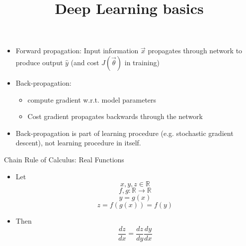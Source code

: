 



\newcommand{\learninggoals}{
\item Understand the concept of regularization
\item Understand L2 regularization in more detail}

\title{Deep Learning basics}
\date{}




\begin{vbframe}{}

\vfill

\begin{itemize}
\item Forward propagation: Input information $\vec x$ propagates through network to produce output $\hat y$ (and cost $J(\vec\theta)$ in training)
\item Back-propagation: 
\begin{itemize}
 \item compute gradient w.r.t. model parameters
 \item Cost gradient propagates backwards through the network
\end{itemize}
\item Back-propagation is part of learning procedure (e.g. stochastic gradient descent), not learning procedure in itself.

\end{itemize}
\begin{center}
\end{center}

\vfill

\end{vbframe}



\begin{vbframe}{Chain Rule of Calculus: Real Functions}

\vfill

\begin{itemize}
\item Let
$$x, y, z \in \mathbb{R}$$
$$f, g : \mathbb{R} \rightarrow \mathbb{R}$$
$$y = g(x)$$
$$z = f(g(x)) = f(y)$$
\item Then
$$\frac{dz}{dx} = \frac{dz}{dy} \frac{dy}{dx}$$
\end{itemize}
\begin{center}
\end{center}

\vfill

\end{vbframe}


